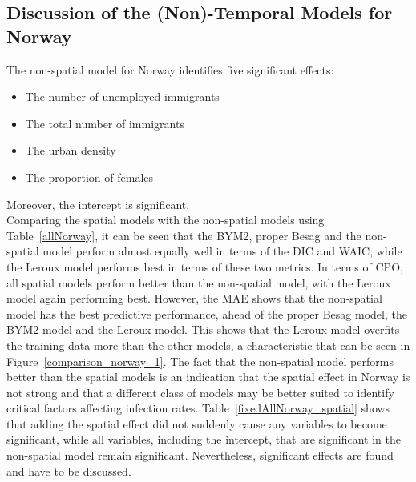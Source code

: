 \subsection{Discussion of the (Non)-Temporal Models for Norway}\label{sec:models_norway}
The non-spatial model for Norway identifies five significant effects:
\begin{itemize}
    \item The number of unemployed immigrants 
    \item The total number of immigrants 
    \item The urban density 
    \item The proportion of females 
\end{itemize}
Moreover, the intercept is significant. \\
Comparing the spatial models with the non-spatial models using Table~\ref{allNorway}, it can be seen that the BYM2, proper Besag and the non-spatial model perform almost equally well in terms of the DIC and WAIC, while the Leroux model performs best in terms of these two metrics. In terms of CPO, all spatial models perform better than the non-spatial model, with the Leroux model again performing best. However, the MAE shows that the non-spatial model has the best predictive performance, ahead of the proper Besag model, the BYM2 model and the Leroux model. This shows that the Leroux model overfits the training data more than the other models, a characteristic that can be seen in Figure~\ref{comparison_norway_1}. The fact that the non-spatial model performs better than the spatial models is an indication that the spatial effect in Norway is not strong and that a different class of models may be better suited to identify critical factors affecting infection rates. Table~\ref{fixedAllNorway_spatial} shows that adding the spatial effect did not suddenly cause any variables to become significant, while all variables, including the intercept, that are significant in the non-spatial model remain significant. Nevertheless, significant effects are found and have to be discussed. \\
